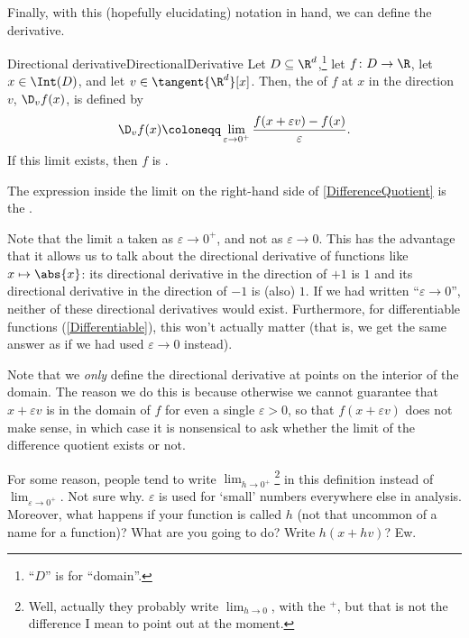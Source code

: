 Finally, with this (hopefully elucidating) notation in hand, we can define the derivative.
\begin{dfn}{Directional derivative}{DirectionalDerivative}
Let $D\subseteq \R ^d$,\footnote{``$D$'' is for ``domain''.} let $f\colon D\rightarrow \R$, let $x\in \Int (D)$, and let $v\in \tangent{\R ^d}[x]$.  Then, the  of $f$ at $x$ in the direction $v$, $\D _vf(x)$, is defined by
\begin{equation}\label{DifferenceQuotient}
\D _vf(x)\coloneqq \lim _{\varepsilon \to 0^+}\frac{f(x+\varepsilon v)-f(x)}{\varepsilon}.
\end{equation}
If this limit exists, then $f$ is .

The expression inside the limit on the right-hand side of \eqref{DifferenceQuotient} is the .
\begin{rmk}
Note that the limit a taken as $\varepsilon \to 0^+$, and not as $\varepsilon \to 0$.  This has the advantage that it allows us to talk about the directional derivative of functions like $x\mapsto \abs{x}$:  its directional derivative in the direction of $+1$ is $1$ and its directional derivative in the direction of $-1$ is (also) $1$.  If we had written ``$\varepsilon \to 0$'', neither of these directional derivatives would exist.  Furthermore, for differentiable functions (\cref{Differentiable}), this won't actually matter (that is, we get the same answer as if we had used $\varepsilon \to 0$ instead).
\end{rmk}
\begin{rmk}
Note that we \emph{only} define the directional derivative at points on the interior of the domain.  The reason we do this is because otherwise we cannot guarantee that $x+\varepsilon v$ is in the domain of $f$ for even a single $\varepsilon >0$, so that $f(x+\varepsilon v)$ does not make sense, in which case it is nonsensical to ask whether the limit of the difference quotient exists or not.
\end{rmk}
\begin{rmk}
For some reason, people tend to write $\lim _{h\to 0^+}$\footnote{Well, actually they probably write $\lim _{h\to 0}$, with the $^+$, but that is not the difference I mean to point out at the moment.} in this definition instead of $\lim _{\varepsilon \to 0^+}$.  Not sure why.  $\varepsilon$ is used for `small' numbers everywhere else in analysis.  Moreover, what happens if your function is called $h$ (not that uncommon of a name for a function)?  What are you going to do?  Write $h(x+hv)$?  Ew.
\end{rmk}
\end{dfn}


